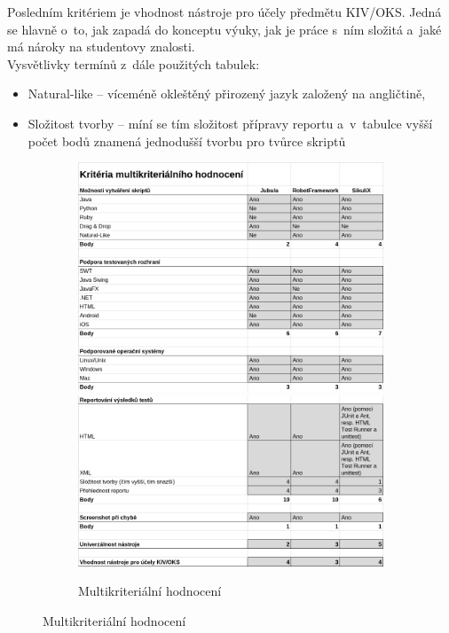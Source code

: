 Posledním kritériem je vhodnost nástroje pro účely předmětu KIV/OKS. Jedná se hlavně o~to, jak zapadá do konceptu výuky, jak je práce s~ním složitá a~jaké má nároky na studentovy znalosti.
\\[0.5cm]Vysvětlivky termínů z~dále použitých tabulek:
\vspace{-\topsep}
\begin{itemize}
	\item Natural-like -- víceméně okleštěný přirozený jazyk založený na angličtině,
	\item Složitost tvorby -- míní se tím složitost přípravy reportu a~v~tabulce vyšší počet bodů znamená jednodušší tvorbu pro tvůrce skriptů
\end{itemize}
\begin{figure}[ht!]
	\begin{subfigure}{\textwidth}
		\centering
		\caption{Multikriteriální hodnocení}
		\label{MKHodn}
		\includegraphics[width=13.5cm]{img/Kriteria/Kriteria1.png}
		\includegraphics[width=13.5cm]{img/Kriteria/Kriteria2.png}
	\end{subfigure}
\end{figure}
